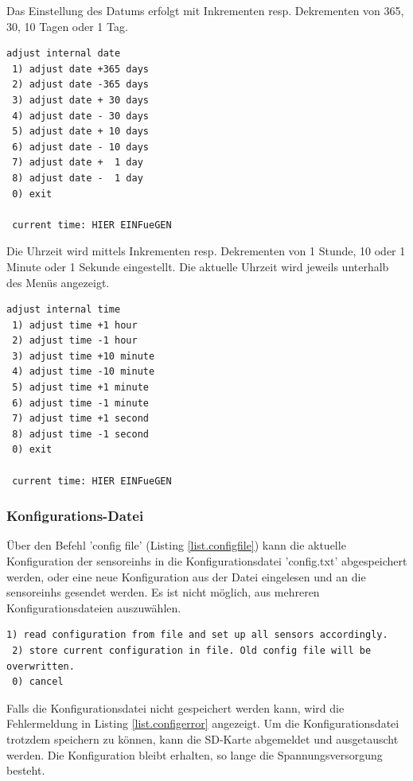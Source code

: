 Das Einstellung des Datums erfolgt mit Inkrementen resp. Dekrementen von 365, 30, 10 Tagen oder 1 Tag.

\begin{lstlisting}[caption=Untermenü Datum einstellen, label=list.setdate]
adjust internal date
 1) adjust date +365 days
 2) adjust date -365 days
 3) adjust date + 30 days
 4) adjust date - 30 days
 5) adjust date + 10 days
 6) adjust date - 10 days
 7) adjust date +  1 day
 8) adjust date -  1 day
 0) exit

 current time: HIER EINFueGEN
\end{lstlisting}

Die Uhrzeit wird mittels Inkrementen resp. Dekrementen von 1 Stunde, 10 oder 1 Minute oder 1 Sekunde eingestellt. Die aktuelle Uhrzeit wird jeweils unterhalb des Menüs angezeigt.

\begin{lstlisting}[caption=Untermenü Uhrzeit einstellen, label=list.settime]
adjust internal time
 1) adjust time +1 hour
 2) adjust time -1 hour
 3) adjust time +10 minute
 4) adjust time -10 minute
 5) adjust time +1 minute
 6) adjust time -1 minute
 7) adjust time +1 second
 8) adjust time -1 second
 0) exit

 current time: HIER EINFueGEN
\end{lstlisting}

\subsubsection{Konfigurations-Datei}

Über den Befehl 'config file' (Listing \ref{list.configfile}) kann die aktuelle Konfiguration der \glspl{sensoreinh} in die Konfigurationsdatei 'config.txt' abgespeichert werden, oder eine neue Konfiguration aus der Datei eingelesen und an die \glspl{sensoreinh} gesendet werden. Es ist nicht möglich, aus mehreren Konfigurationsdateien auszuwählen.

\begin{lstlisting}[caption=Untermenü Konfigurationsdatei, label=list.config]
 1) read configuration from file and set up all sensors accordingly.
 2) store current configuration in file. Old config file will be overwritten.
 0) cancel
\end{lstlisting}

Falls die Konfigurationsdatei nicht gespeichert werden kann, wird die Fehlermeldung in Listing \ref{list.configerror} angezeigt. Um die Konfigurationsdatei trotzdem speichern zu können, kann die SD-Karte abgemeldet und ausgetauscht werden. Die Konfiguration bleibt erhalten, so lange die Spannungsversorgung besteht.

